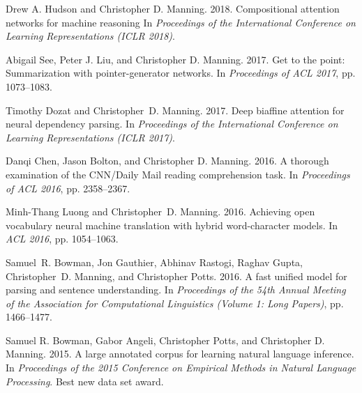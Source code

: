 \documentclass[11pt]{article}
\begin{document}
\begin{vita}
\begin{Important Recent Publications}

\item Drew A. Hudson and Christopher D. Manning. 2018. 
Compositional attention networks for machine reasoning
In {\em Proceedings of the International Conference on Learning
  Representations (ICLR 2018)}.

\item Abigail See, Peter J. Liu, and Christopher D. Manning. 2017. Get
  to the point: Summarization with pointer-generator networks. In
  \emph{Proceedings of ACL 2017}, pp. 1073--1083.

\item Timothy Dozat and Christopher~D. Manning.
2017.
Deep biaffine attention for neural dependency parsing.
In {\em Proceedings of the International Conference on Learning
  Representations (ICLR 2017)}.



\item Danqi Chen, Jason Bolton, and Christopher D. Manning. 2016. A
  thorough examination of the CNN\slash Daily Mail reading
  comprehension task. In \emph{Proceedings of ACL 2016}, pp. 2358--2367.

\item Minh-Thang Luong and Christopher~D. Manning. 2016. Achieving open vocabulary neural machine translation with hybrid
  word-character models. In {\em ACL 2016}, pp. 1054--1063.

\item Samuel~R. Bowman, Jon Gauthier, Abhinav Rastogi, Raghav Gupta, Christopher~D.
  Manning, and Christopher Potts.
2016.
A fast unified model for parsing and sentence understanding.
In {\em Proceedings of the 54th Annual Meeting of the Association for
  Computational Linguistics (Volume 1: Long Papers)}, pp. 1466--1477.

\item Samuel R. Bowman, Gabor Angeli, Christopher Potts, and Christopher D. Manning. 2015. A large annotated corpus for learning natural language inference. In \emph{Proceedings of the 2015 Conference on Empirical Methods in Natural Language Processing}. Best new data set award.


\end{Important Recent Publications}
\end{vita}
\end{document}
